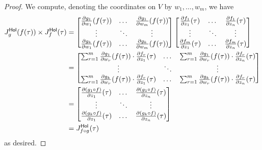 \begin{proof}
    We compute, denoting the coordinates on $V$ by $w_{1},\dots,w_{m}$, we have 
    \begin{align*}
        J_{g}^{\mathsf{Hol}}(f(\tau))\times J_{f}^{\mathsf{Hol}}(\tau) &= \begin{bmatrix}
            \frac{\partial g_{1}}{\partial w_{1}}(f(\tau)) & \dots & \frac{\partial g_{1}}{\partial w_{m}}(f(\tau)) \\
            \vdots & \ddots & \vdots \\
            \frac{\partial g_{k}}{\partial w_{1}}(f(\tau)) & \dots & \frac{\partial g_{k}}{\partial w_{m}}(f(\tau))
        \end{bmatrix}\begin{bmatrix}
            \frac{\partial f_{1}}{\partial z_{1}}(\tau) & \dots & \frac{\partial f_{1}}{\partial z_{n}}(\tau) \\
            \vdots & \ddots & \vdots \\
            \frac{\partial f_{m}}{\partial z_{1}}(\tau) & \dots & \frac{\partial f_{m}}{\partial z_{n}}(\tau)
        \end{bmatrix} \\
        &= \begin{bmatrix}
            \sum_{r=1}^{m}\frac{\partial g_{1}}{\partial w_{r}}(f(\tau))\cdot\frac{\partial f_{r}}{\partial z_{1}}(\tau) & \dots & \sum_{r=1}^{m}\frac{\partial g_{1}}{\partial w_{r}}(f(\tau))\cdot\frac{\partial f_{r}}{\partial z_{n}}(\tau) \\
            \vdots & \ddots & \vdots \\
            \sum_{r=1}^{m}\frac{\partial g_{k}}{\partial w_{r}}(f(\tau))\cdot\frac{\partial f_{r}}{\partial z_{1}}(\tau) & \dots & \sum_{r=1}^{m}\frac{\partial g_{k}}{\partial w_{r}}(f(\tau))\cdot\frac{\partial f_{r}}{\partial z_{n}}(\tau)
        \end{bmatrix} \\
        &= \begin{bmatrix}
            \frac{\partial(g_{1}\circ f)}{\partial z_{1}}(\tau) & \dots & \frac{\partial (g_{1}\circ f)}{\partial z_{n}}(\tau) \\
            \vdots & \ddots & \vdots \\
            \frac{\partial(g_{k}\circ f)}{\partial z_{1}}(\tau) & \dots & \frac{\partial (g_{k}\circ f)}{\partial z_{n}}(\tau)
        \end{bmatrix}\\
        &= J^{\mathsf{Hol}}_{f\circ g}(\tau)
    \end{align*}
    as desired. 
\end{proof}
